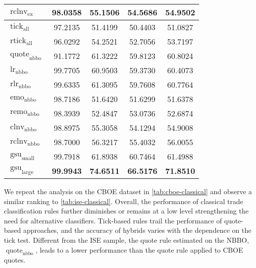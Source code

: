 \begin{table}[h]
\begin{tabular}{lSSSS}
        $\operatorname{rclnv}_{\mathrm{ex}}$   & 98.0358           & 55.1506                            & 54.5686           & 54.9502           \\\midrule
        $\operatorname{tick}_{\mathrm{all}}$   & 97.2135           & 51.4199                            & 50.4403           & 51.0827           \\
        $\operatorname{rtick}_{\mathrm{all}}$  & 96.0292           & 54.2521                            & 52.7056           & 53.7197           \\\midrule
        $\operatorname{quote}_{\mathrm{nbbo}}$ & 91.1772           & 61.3222                            & 59.8123           & 60.8024           \\
        $\operatorname{lr}_{\mathrm{nbbo}}$    & 99.7705           & 60.9503                            & 59.3730           & 60.4073           \\
        $\operatorname{rlr}_{\mathrm{nbbo}}$   & 99.6335           & 61.3095                            & 59.7608           & 60.7764           \\
        $\operatorname{emo}_{\mathrm{nbbo}}$   & 98.7186           & 51.6420                            & 51.6299           & 51.6378           \\
        $\operatorname{remo}_{\mathrm{nbbo}}$  & 98.3939           & 52.4847                            & 53.0736           & 52.6874           \\
        $\operatorname{clnv}_{\mathrm{nbbo}}$  & 98.8975           & 55.3058                            & 54.1294           & 54.9008           \\
        $\operatorname{rclnv}_{\mathrm{nbbo}}$ & 98.7000           & 56.3217                            & 55.4032           & 56.0055           \\\midrule
        $\operatorname{gsu}_{\mathrm{small}}$  & 99.7918           & 61.8938                            & 60.7464           & 61.4988           \\
        $\operatorname{gsu}_{\mathrm{large}}$  & \bfseries 99.9943 & \bfseries 74.6511                  & \bfseries 66.5176 & \bfseries 71.8510 \\\bottomrule
    \end{tabular}
\end{table}

We repeat the analysis on the \gls{CBOE} dataset in \cref{tab:cboe-classical} and observe a similar ranking to \cref{tab:ise-classical}. Overall, the performance of classical trade classification rules further diminishes or remains at a low level strengthening the need for alternative classifiers. Tick-based rules trail the performance of quote-based approaches, and the accuracy of hybrids varies with the dependence on the tick test. Different from the \gls{ISE} sample, the quote rule estimated on the \gls{NBBO}, $\operatorname{quote}_{\mathrm{nbbo}}$, leads to a lower performance than the quote rule applied to \gls{CBOE} quotes.

